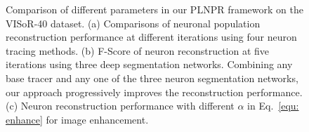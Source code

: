 \begin{figure}[t]
	\centering
	\caption{ Comparison of different parameters in our PLNPR framework on the VISoR-40 dataset.
		(a) Comparisons of neuronal population reconstruction performance at different iterations using four neuron tracing methods. 
		(b) F-Score of neuron reconstruction at five iterations using three deep segmentation networks. 
		Combining any base tracer and any one of the three neuron segmentation networks, our approach progressively improves the reconstruction performance.
		(c) Neuron reconstruction performance with different $\alpha$ in Eq.~\eqref{equ: enhance} for image enhancement.} %
	
	\label{fig:ablation_study_plnpr}
\end{figure}


